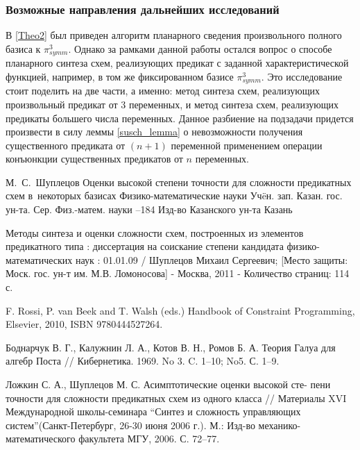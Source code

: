 \documentclass[12pt]{extarticle}
\begin{document}
\subsubsection*{Возможные направления дальнейших исследований}

В \ref{Theo2} был приведен алгоритм планарного сведения произвольного полного базиса к $\pi_{symm}^3$.
Однако за рамками данной работы остался вопрос о способе планарного синтеза схем, реализующих предикат 
с заданной характеристической функцией, например, в том же фиксированном базисе $\pi_{symm}^3$. 
Это исследование стоит поделить на две части, а именно: 
метод синтеза схем, реализующих произвольный предикат от 3 переменных, и метод синтеза схем, реализующих предикаты
большего числа переменных. Данное разбиение на подзадачи придется произвести в силу леммы \ref{susch_lemma} 
о невозможности получения 
существенного предиката от $(n+1)$ переменной применением операции конъюнкции существенных предикатов от $n$ переменных.

\clearpage
{}
    \by М.~С.~Шуплецов
    \paper Оценки высокой степени точности для сложности предикатных схем в~некоторых базисах
    \inbook Физико-математические науки
    \serial Уч\"eн. зап. Казан. гос. ун-та. Сер. Физ.-матем. науки
    --184
    \publ Изд-во Казанского ун-та
    \publaddr Казань

Методы синтеза и оценки сложности схем, построенных из элементов предикатного типа : 
диссертация на соискание степени кандидата физико-математических наук : 01.01.09 / Шуплецов Михаил Сергеевич; 
[Место защиты: Моск. гос. ун-т им. М.В. Ломоносова] - Москва, 2011 - Количество страниц: 114 с.

 F. Rossi, P. van Beek and T. Walsh (eds.) Handbook of Constraint Programming, Elsevier, 2010, ISBN 9780444527264.

Боднарчук В. Г., Калужнин Л. А., Котов В. Н., Ромов Б. А. Теория
Галуа для алгебр Поста // Кибернетика. 1969. No 3. C. 1–10; No5. С. 1–9.

Ложкин С. А., Шуплецов М. С. Асимптотические оценки высокой сте-
пени точности для сложности предикатных схем из одного класса //
Материалы XVI Международной школы-семинара 
``Синтез и сложность управляющих систем''(Санкт-Петербург, 26-30 июня 2006 г.). М.:
Изд-во механико-математического факультета МГУ, 2006. С. 72–77.
\end{document}
